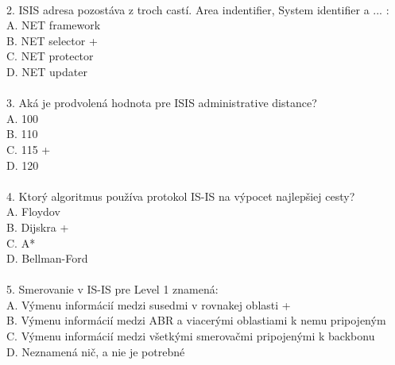 \documentclass[12pt,twoside,a4paper]{report}
\begin{document}
\paragraph{}
2. ISIS adresa pozostáva z troch castí. Area indentifier, System identifier a ... :\\
  A. NET framework\\
  B. NET selector +\\
  C. NET protector\\
  D. NET updater\\

\paragraph{}
3. Aká je prodvolená hodnota pre ISIS administrative distance?\\
  A. 100\\
  B. 110\\
  C. 115 +\\
  D. 120\\

\paragraph{}
4. Ktorý algoritmus používa protokol IS-IS na výpocet najlepšiej cesty?\\
  A. Floydov\\
  B. Dijskra +\\
  C. A*\\
  D. Bellman-Ford\\

\paragraph{}
5. Smerovanie v IS-IS pre Level 1 znamená: \\
  A. Výmenu informácií medzi susedmi v rovnakej oblasti +\\
  B. Výmenu informácií medzi ABR a viacerými oblastiami k nemu pripojeným\\
  C. Výmenu informácií medzi všetkými smerovačmi pripojenými k backbonu\\
  D. Neznamená nič, a nie je potrebné\\
\end{document}
